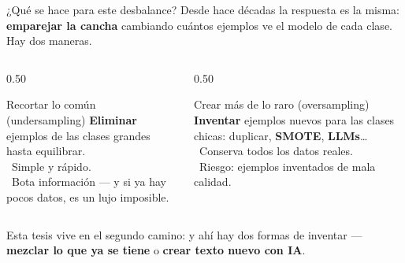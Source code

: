 \begin{frame}{¿Qué se hace para este desbalance?}
\small
Desde hace décadas la respuesta es la misma: \textbf{emparejar la cancha} cambiando cuántos ejemplos ve el modelo de cada clase. Hay dos maneras.

\vspace{0.5em}
\begin{columns}[T]

\begin{column}{0.50\textwidth}
\begin{block}{Recortar lo común \textmd{\scriptsize(undersampling)}}
\scriptsize
\textbf{Eliminar} ejemplos de las clases grandes hasta equilibrar.\\[3pt]
\good\ Simple y rápido.\\
\bad\ \alert{Bota información} — y si ya hay pocos datos, es un lujo imposible.
\end{block}
\end{column}

\begin{column}{0.50\textwidth}
\begin{block}{Crear más de lo raro \textmd{\scriptsize(oversampling)}}
\scriptsize
\textbf{Inventar} ejemplos nuevos para las clases chicas: duplicar, \textbf{SMOTE}, \textbf{LLMs}\dots\\[3pt]
\good\ Conserva todos los datos reales.\\
\bad\ Riesgo: ejemplos inventados \alert{de mala calidad}.
\end{block}
\end{column}

\end{columns}

\vspace{0.7em}
\centering
{\small Esta tesis vive en el segundo camino: y ahí hay dos formas de inventar — \textbf{mezclar lo que ya se tiene} o \textbf{crear texto nuevo con IA}.}

\end{frame}
